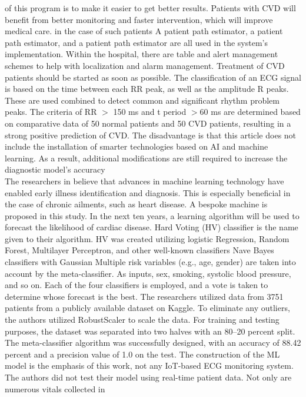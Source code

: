 \documentclass{bmcart}
\begin{document}
of this program is to make it easier to get better results. Patients with CVD
will benefit from better monitoring and faster intervention, which will improve
medical care. in the case of such patients A patient path estimator, a patient
path estimator, and a patient path estimator are all used in the system's
implementation.  Within the hospital, there are table and alert management
schemes to help with localization and alarm management. Treatment of CVD
patients should be started as soon as possible. The classification of an ECG
signal is based on the time between each RR peak, as well as the amplitude R
peaks. These are used combined to detect common and significant rhythm problem
peaks. The criteria of RR $>$ 150 ms and t period $>$60 ms are determined based
on comparative data of 50 normal patients and 50 CVD patients, resulting in a
strong positive prediction of CVD. The disadvantage is that this article does
not include the installation of smarter technologies based on AI and machine
learning. As a result, additional modifications are still required to increase
the diagnostic model's accuracy\\
The researchers in \cite{9350514} believe that advances in machine learning technology have
enabled early illness identification and diagnosis. This is especially
beneficial in the case of chronic ailments, such as heart disease. A bespoke
machine is proposed in this study. In the next ten years, a learning algorithm
will be used to forecast the likelihood of cardiac disease. Hard Voting (HV)
classifier is the name given to their algorithm. HV was created utilizing
logistic Regression, Random Forest, Multilayer Perceptron, and other well-known
classifiers  Nave Bayes classifiers with Gaussian Multiple risk variables (e.g.,
age, gender) are taken into account by the meta-classifier. As inputs, sex,
smoking, systolic blood pressure, and so on. Each of the four classifiers is
employed, and  a vote is taken to determine whose forecast is the best. The
researchers utilized data from 3751 patients from a publicly available dataset
on Kaggle. To eliminate any outliers, the authors utilized RobustScaler to scale
the data. For training and testing purposes, the dataset was separated into two
halves with an 80–20 percent split. The meta-classifier algorithm was
successfully designed, with an accuracy of 88.42 percent and a precision value
of 1.0 on the test. The construction of the ML model is the emphasis of this
work, not any IoT-based ECG monitoring system. The authors did not test their
model using real-time patient data. Not only are numerous vitals collected in
\end{document}
